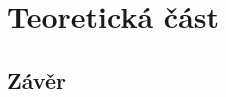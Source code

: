 \documentclass[twoside]{ctuthesis}
\theoremstyle{plain}
\theoremstyle{definition}
\theoremstyle{note}
\begin{document}
\maketitle




\part{Teoretická část}




%






\chapter{Závěr}


\appendix

\printindex


%
%

\end{document}
